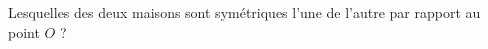 
    \begin{mental}
        Lesquelles des deux maisons sont symétriques l'une de l'autre par rapport au point \( O\) ?
\begin{center}
    \large
   
\end{center}
    \end{mental}
